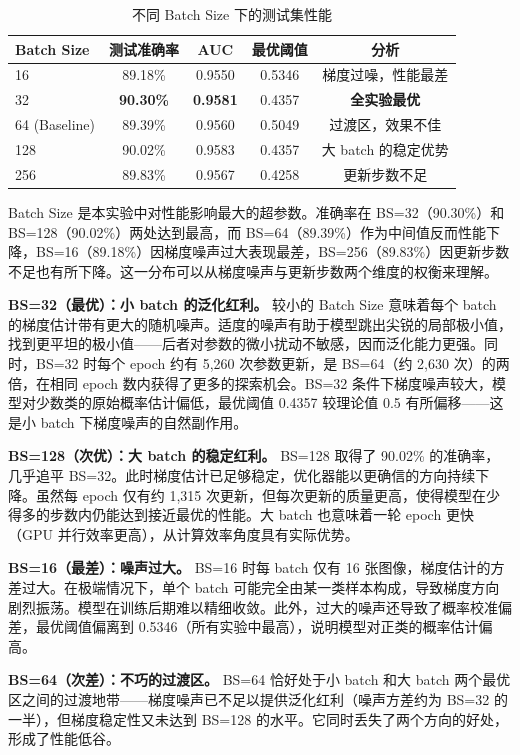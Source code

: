 \documentclass[12pt,a4paper]{ctexart}
\begin{document}
\begin{table}[H]
\centering
\caption{不同 Batch Size 下的测试集性能}
\begin{tabular}{lcccc}
\toprule
Batch Size & 测试准确率 & AUC & 最优阈值 & 分析 \\
\midrule
16  & 89.18\% & 0.9550 & 0.5346 & 梯度过噪，性能最差 \\
32  & \textbf{90.30\%} & \textbf{0.9581} & 0.4357 & \textbf{全实验最优} \\
64 (Baseline) & 89.39\% & 0.9560 & 0.5049 & 过渡区，效果不佳 \\
128 & 90.02\% & 0.9583 & 0.4357 & 大 batch 的稳定优势 \\
256 & 89.83\% & 0.9567 & 0.4258 & 更新步数不足 \\
\bottomrule
\end{tabular}
\end{table}

Batch Size 是本实验中对性能影响最大的超参数。准确率在 BS=32（90.30\%）和 BS=128（90.02\%）两处达到最高，而 BS=64（89.39\%）作为中间值反而性能下降，BS=16（89.18\%）因梯度噪声过大表现最差，BS=256（89.83\%）因更新步数不足也有所下降。这一分布可以从梯度噪声与更新步数两个维度的权衡来理解。

\textbf{BS=32（最优）：小 batch 的泛化红利。} 较小的 Batch Size 意味着每个 batch 的梯度估计带有更大的随机噪声。适度的噪声有助于模型跳出尖锐的局部极小值，找到更平坦的极小值——后者对参数的微小扰动不敏感，因而泛化能力更强。同时，BS=32 时每个 epoch 约有 5,260 次参数更新，是 BS=64（约 2,630 次）的两倍，在相同 epoch 数内获得了更多的探索机会。BS=32 条件下梯度噪声较大，模型对少数类的原始概率估计偏低，最优阈值 0.4357 较理论值 0.5 有所偏移——这是小 batch 下梯度噪声的自然副作用。

\textbf{BS=128（次优）：大 batch 的稳定红利。} BS=128 取得了 90.02\% 的准确率，几乎追平 BS=32。此时梯度估计已足够稳定，优化器能以更确信的方向持续下降。虽然每 epoch 仅有约 1,315 次更新，但每次更新的质量更高，使得模型在少得多的步数内仍能达到接近最优的性能。大 batch 也意味着一轮 epoch 更快（GPU 并行效率更高），从计算效率角度具有实际优势。

\textbf{BS=16（最差）：噪声过大。} BS=16 时每 batch 仅有 16 张图像，梯度估计的方差过大。在极端情况下，单个 batch 可能完全由某一类样本构成，导致梯度方向剧烈振荡。模型在训练后期难以精细收敛。此外，过大的噪声还导致了概率校准偏差，最优阈值偏离到 0.5346（所有实验中最高），说明模型对正类的概率估计偏高。

\textbf{BS=64（次差）：不巧的过渡区。} BS=64 恰好处于小 batch 和大 batch 两个最优区之间的过渡地带——梯度噪声已不足以提供泛化红利（噪声方差约为 BS=32 的一半），但梯度稳定性又未达到 BS=128 的水平。它同时丢失了两个方向的好处，形成了性能低谷。
\end{document}
